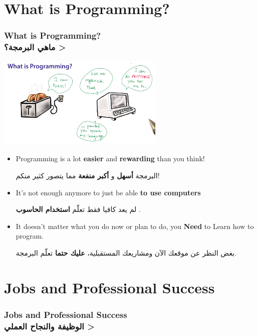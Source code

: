 \documentclass[9pt]{beamer}
\begin{document}
	\section{What is Programming?} %
	\begin{frame}
		\frametitle{
			What is Programming?\\
			\<
			ماهي البرمجة؟
			>
		}
		
		\begin{center}
			\includegraphics[width=0.6\textwidth]{images/what-is-programming.png}
		\end{center}
		
		\begin{itemize}
			\item	Programming is a lot \textbf{easier} and \textbf{rewarding} than you think!
					\begin{arabtext}
					البرمجة
					\textbf{
						أسهل
					}
					و
					\textbf
					{
						أكبر منفعة
					}
					مما يتصور كثير منكم!
					\end{arabtext}
			\item 	It's not enough anymore to just be able \textbf{to use computers}
					\begin{arabtext}
					لم يعد كافيا فقط تعلّم 
					\textbf{
						استخدام الحاسوب
					}.
					\end{arabtext}
			\item 	It doesn't matter what you do now or plan to do, you \textbf{Need} to Learn how to program.
					\begin{arabtext}
					بغض النظر عن موقعك الآن ومشاريعك المستقبلية،
					\textbf{
						عليك حتما
					}
					تعلّم البرمجة.
					\end{arabtext}
		\end{itemize}
	\end{frame}
	
	\section{Jobs and Professional Success}
	\begin{frame}
		\frametitle{
			Jobs and Professional Success\\
			\<
			الوظيفة والنجاح العملي
			>
		}		
	\end{frame}
	
\end{document}
